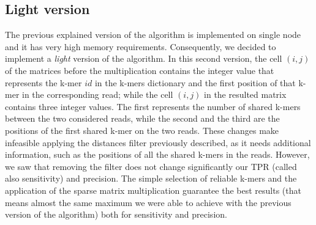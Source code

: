 \documentclass[11pt]{article}
\begin{document}
\subsection{Light version}

The previous explained version of the algorithm is implemented on single node and it has very high memory requirements. 
Consequently, we decided to implement a \emph{light} version of the algorithm.
In this second version, the cell $(i,j)$ of the matrices before the multiplication contains the integer value that represents the k-mer $id$ in the k-mers dictionary and the first position of that k-mer in the corresponding read; while the cell $(i,j)$ in the resulted matrix contains three integer values. 
The first represents the number of shared k-mers between the two considered reads, while the second and the third are the positions of the first shared k-mer on the two reads.
These changes make infeasible applying the distances filter previously described, as it needs additional information, such as the positions of all the shared k-mers in the reads.
However, we saw that removing the filter does not change significantly our TPR (called also sensitivity) and precision.
The simple selection of reliable k-mers and the application of the sparse matrix multiplication guarantee the best results (that means almost the same maximum we were able to achieve with the previous version of the algorithm) both for sensitivity and precision.
\end{document}
